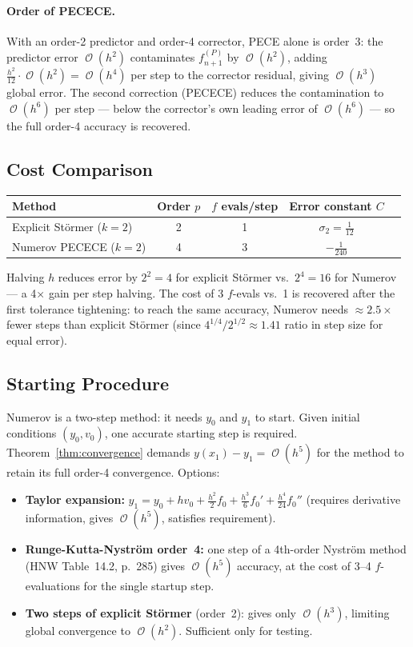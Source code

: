 \documentclass[11pt]{article}
\DeclareMathOperator{\OO}{\mathcal{O}}
\begin{document}
\paragraph{Order of PECECE.}
With an order-2 predictor and order-4 corrector, PECE alone is order~3: the
predictor error $\OO(h^2)$ contaminates $f_{n+1}^{(P)}$ by $\OO(h^2)$, adding
$\tfrac{h^2}{12}\cdot\OO(h^2) = \OO(h^4)$ per step to the corrector residual,
giving $\OO(h^3)$ global error.  The second correction (PECECE) reduces the
contamination to $\OO(h^6)$ per step --- below the corrector's own leading
error of $\OO(h^6)$ --- so the full order-4 accuracy is recovered.

\subsection{Cost Comparison}

\begin{center}
\begin{tabular}{@{}lcccc@{}}
  \toprule
  Method & Order $p$ & $f$ evals/step & Error constant $C$ \\
  \midrule
  Explicit Störmer ($k=2$) & 2 & 1 & $\sigma_2 = \tfrac{1}{12}$ \\
  Numerov PECECE ($k=2$)   & 4 & 3 & $-\tfrac{1}{240}$\\
  \bottomrule
\end{tabular}
\end{center}

Halving $h$ reduces error by $2^2 = 4$ for explicit Störmer vs.\ $2^4 = 16$
for Numerov --- a 4$\times$ gain per step halving.  The cost of 3 $f$-evals vs.\
1 is recovered after the first tolerance tightening: to reach the same accuracy,
Numerov needs $\approx 2.5\times$ fewer steps than explicit Störmer (since
$4^{1/4} / 2^{1/2} \approx 1.41$ ratio in step size for equal error).

\subsection{Starting Procedure}

Numerov is a two-step method: it needs $y_0$ and $y_1$ to start.  Given initial
conditions $(y_0, v_0)$, one accurate starting step is required.
Theorem~\ref{thm:convergence} demands $y(x_1) - y_1 = \OO(h^5)$ for the
method to retain its full order-4 convergence.  Options:

\begin{itemize}
  \item \textbf{Taylor expansion:}
    $y_1 = y_0 + hv_0 + \tfrac{h^2}{2}f_0 + \tfrac{h^3}{6}f_0' + \tfrac{h^4}{24}f_0''$
    (requires derivative information, gives $\OO(h^5)$, satisfies requirement).
  \item \textbf{Runge-Kutta-Nyström order~4:} one step of a 4th-order Nyström
    method (HNW Table~14.2, p.~285) gives $\OO(h^5)$ accuracy, at the cost of 3--4
    $f$-evaluations for the single startup step.
  \item \textbf{Two steps of explicit Störmer} (order~2): gives only $\OO(h^3)$,
    limiting global convergence to $\OO(h^2)$.  Sufficient only for testing.
\end{itemize}
\end{document}
